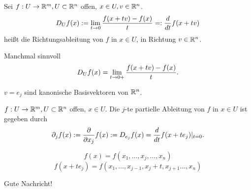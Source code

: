 \documentclass[../ana2.tex]{subfiles}
\begin{document}
\begin{defi}[Richtungsableitung]
    Sei \( f:U\rightarrow \mathbb{R}^m, U \subset \mathbb{R}^n \) offen, 
    \( x \in U, v \in \mathbb{R}^n \).
    \[ D_U f(x) := \lim\limits_{t\rightarrow{}0} \frac{f(x + tv) - f(x)}{t} 
    =: \frac{d}{dt} f(x + tv) \]
    heißt die Richtungsableitung von \( f \) in \( x\in U \), 
    in Richtung \( v \in \mathbb{R}^n \).
\end{defi}
\begin{bem}
    Manchmal sinnvoll
    \[ D_U f(x) = \lim\limits_{t\rightarrow{}0+} \frac{f(x + tv) - f(x)}{t}. \]
\end{bem}
\begin{bsp}
    \( v = e_j \) sind kanonische Basisvektoren von \( \mathbb{R}^n \).
\end{bsp}
\begin{defi}
    \( f:U\rightarrow \mathbb{R}^m, U \subset \mathbb{R}^n \) offen, \( x\in U \).
    Die \(j\)-te partielle Ableitung von \(f\) in \(x \in U\) 
    ist gegeben durch
    \[ \partial_j f(x) := \frac{\partial}{\partial x_j} f(x) 
    := D_{e_j} f(x) = \frac{d}{dt} f(x + t e_j) \vert_{t=0}. \]
\end{defi}
\begin{bem}
    \[ f(x) = f(x_1, \ldots, x_j, \ldots, x_n) \]
    \[ f(x+t e_j) = f(x_1, \ldots, x_{j-1}, 
    x_j + t, x_{j+1} \ldots, x_n) \]
\end{bem}
Gute Nachricht!
\end{document}
